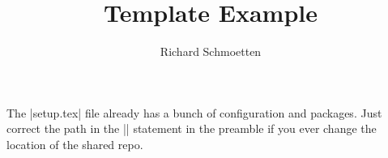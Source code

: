 \documentclass[]{article}
\title{Template Example}
\author{Richard Schmoetten}
\begin{document}
\maketitle

The \lisa|setup.tex| file already has a bunch of configuration and packages. Just correct the path in the \lisa|| statement in the preamble if you ever change the location of the shared repo.
\cite{knuth2014}


\printbibliography
\end{document}
